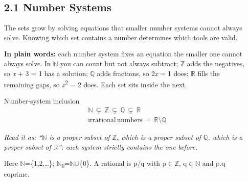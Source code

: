 \documentclass[11pt]{article}
\begin{document}
\begin{keepsection}
\section{2.1 Number Systems}

The sets grow by solving equations that smaller number systems cannot always solve. Knowing which set contains a number determines which tools are valid.

\begin{plainbox}\textbf{In plain words:} each number system fixes an equation the smaller one cannot always solve. In \ensuremath{\mathbb{N}} you can count but not always subtract; \ensuremath{\mathbb{Z}} adds the negatives, so \textit{x} + 3 = 1 has a solution; \ensuremath{\mathbb{Q}} adds fractions, so 2\textit{x} = 1 does; \ensuremath{\mathbb{R}} fills the remaining gaps, so \textit{x}\textsuperscript{2} = 2 does. Each set sits inside the next.\end{plainbox}

\begin{equationcard}{Number-system inclusion}
\[ \begin{gathered} \mathbb{N}\, \subsetneq \, \mathbb{Z}\, \subsetneq \, \mathbb{Q}\, \subsetneq \, \mathbb{R} \\ \text{irrational}\, \text{numbers}\, =\, \mathbb{R}\setminus \mathbb{Q} \end{gathered} \]
{\small \emph{Read it as: “\ensuremath{\mathbb{N}} is a proper subset of \ensuremath{\mathbb{Z}}, which is a proper subset of \ensuremath{\mathbb{Q}}, which is a proper subset of \ensuremath{\mathbb{R}}”: each system strictly contains the one before.}\par Here \ensuremath{\mathbb{N}}=\{1,2,…\}; \ensuremath{\mathbb{N}}\textsubscript{0}=\ensuremath{\mathbb{N}}\ensuremath{\cup}\{0\}. A rational is p/q with p\ensuremath{\in}\ensuremath{\mathbb{Z}}, q\ensuremath{\in}\ensuremath{\mathbb{N}} and p,q coprime.}
\end{equationcard}


\end{keepsection}
\end{document}
